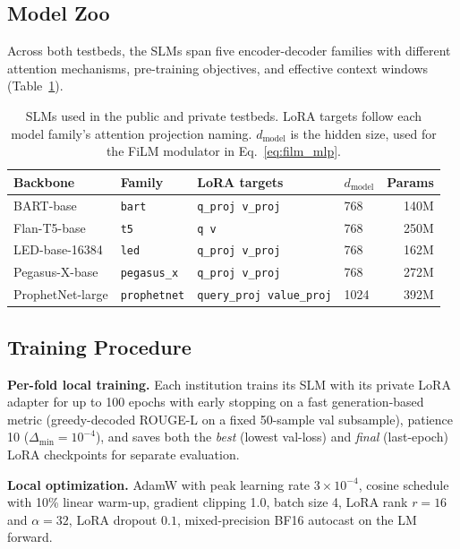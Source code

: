 \documentclass[11pt]{article}
\theoremstyle{plain}
\theoremstyle{definition}
\theoremstyle{remark}
\begin{document}
\subsection{Model Zoo}
\label{sec:models}

Across both testbeds, the SLMs span five
encoder-decoder families with different attention
mechanisms, pre-training objectives, and effective
context windows (Table~\ref{tab:client_models}).

\begin{table}[t]
\centering
\small
\caption{SLMs used in the public and private testbeds.
LoRA targets follow each model family's attention
projection naming. $d_{\text{model}}$ is the hidden
size, used for the FiLM modulator in
Eq.~\ref{eq:film_mlp}.}
\label{tab:client_models}
\begin{tabular}{lll@{\hskip 4pt}lr}
\toprule
\textbf{Backbone} & \textbf{Family} &
\textbf{LoRA targets} & \textbf{$d_{\text{model}}$} &
\textbf{Params} \\
\midrule
BART-base                & \texttt{bart}       & \texttt{q\_proj v\_proj}        & 768 & 140M \\
Flan-T5-base             & \texttt{t5}         & \texttt{q v}                    & 768 & 250M \\
LED-base-16384           & \texttt{led}        & \texttt{q\_proj v\_proj}        & 768 & 162M \\
Pegasus-X-base           & \texttt{pegasus\_x} & \texttt{q\_proj v\_proj}        & 768 & 272M \\
ProphetNet-large         & \texttt{prophetnet} & \texttt{query\_proj value\_proj} & 1024 & 392M \\
\bottomrule
\end{tabular}
\end{table}

\subsection{Training Procedure}
\label{sec:training}

\textbf{Per-fold local training.} Each institution
trains its SLM with its private LoRA adapter for up
to 100 epochs with early stopping on a fast
generation-based metric (greedy-decoded ROUGE-L on a
fixed 50-sample val subsample), patience 10
($\Delta_{\min}{=}10^{-4}$), and saves both the
\emph{best} (lowest val-loss) and \emph{final}
(last-epoch) LoRA checkpoints for separate evaluation.

\textbf{Local optimization.} AdamW with peak learning
rate $3{\times}10^{-4}$, cosine schedule with 10\%
linear warm-up, gradient clipping 1.0, batch size 4,
LoRA rank $r{=}16$ and $\alpha{=}32$, LoRA dropout
$0.1$, mixed-precision BF16 autocast on the LM
forward.
\end{document}
